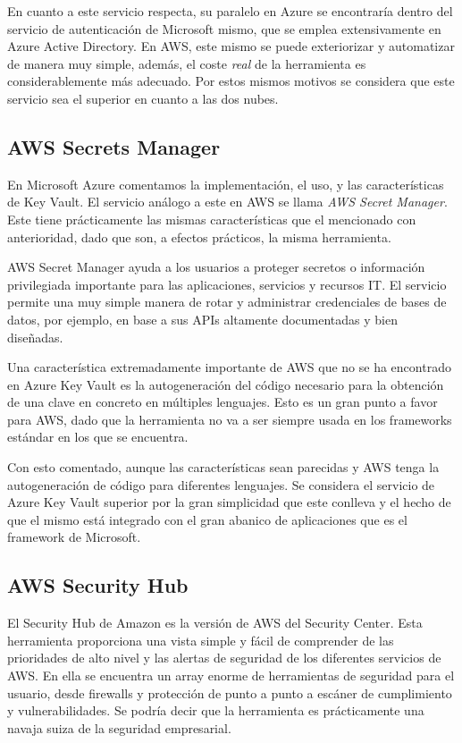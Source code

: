 \documentclass[english,runningheads,a4paper]{llncs}[2018/03/10]
\begin{document}
En cuanto a este servicio respecta, su paralelo en Azure se encontraría dentro
del servicio de autenticación de Microsoft mismo, que se emplea extensivamente
en Azure Active Directory. En AWS, este mismo se puede exteriorizar y
automatizar de manera muy simple, además, el coste \textit{real} de la
herramienta es considerablemente más adecuado. Por estos mismos motivos se
considera que este servicio sea el superior en cuanto a las dos nubes.

\subsection*{AWS Secrets Manager}
En Microsoft Azure comentamos la implementación, el uso, y las características
de Key Vault. El servicio análogo a este en AWS se llama \textit{AWS Secret
Manager}. Este tiene prácticamente las mismas características que el mencionado
con anterioridad, dado que son, a efectos prácticos, la misma herramienta. 

AWS Secret Manager ayuda a los usuarios a proteger secretos o información
privilegiada importante para las aplicaciones, servicios y recursos IT. El
servicio permite una muy simple manera de rotar y administrar credenciales de
bases de datos, por ejemplo, en base a sus APIs altamente documentadas y bien
diseñadas.

Una característica extremadamente importante de AWS que no se ha encontrado en
Azure Key Vault es la autogeneración del código necesario para la obtención de
una clave en concreto en múltiples lenguajes. Esto es un gran punto a favor para
AWS, dado que la herramienta no va a ser siempre usada en los frameworks
estándar en los que se encuentra.

Con esto comentado, aunque las características sean parecidas y AWS tenga la
autogeneración de código para diferentes lenguajes. Se considera el servicio de
Azure Key Vault superior por la gran simplicidad que este conlleva y el hecho de
que el mismo está integrado con el gran abanico de aplicaciones que es el
framework de Microsoft.

\subsection*{AWS Security Hub}
El Security Hub de Amazon es la versión de AWS del Security Center. Esta
herramienta proporciona una vista simple y fácil de comprender de las
prioridades de alto nivel y las alertas de seguridad de los diferentes servicios
de AWS. En ella se encuentra un array enorme de herramientas de seguridad para
el usuario, desde firewalls y protección de punto a punto a escáner de
cumplimiento y vulnerabilidades. Se podría decir que la herramienta es
prácticamente una navaja suiza de la seguridad empresarial.
\end{document}
